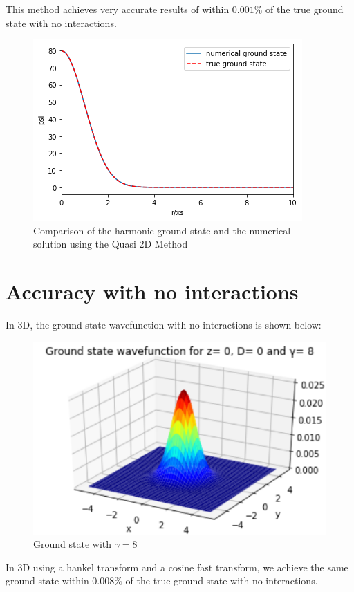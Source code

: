 \documentclass[10pt]{article}
\numberwithin{equation}{section}
\begin{document}
\begin{multicols}{2}
This method achieves very accurate results of within $0.001\%$ of the true ground state with no interactions.
\begin{figure}[H]
\centering
\includegraphics[width=0.8\linewidth]{gndstateQuasi2DHankel}
\caption{Comparison of the harmonic ground state and the numerical solution using the Quasi 2D Method}
\end{figure}


\section{Accuracy with no interactions}
In 3D, the ground state wavefunction with no interactions is shown below:

\begin{figure}[H]
\centering
\includegraphics[width=0.8\linewidth]{gndstate1}
\caption{Ground state with $\gamma=8$}
\end{figure}

In 3D using a hankel transform and a cosine fast transform, we achieve the same ground state within $0.008\%$ of the true ground state with no interactions.


\end{multicols}
\end{document}
